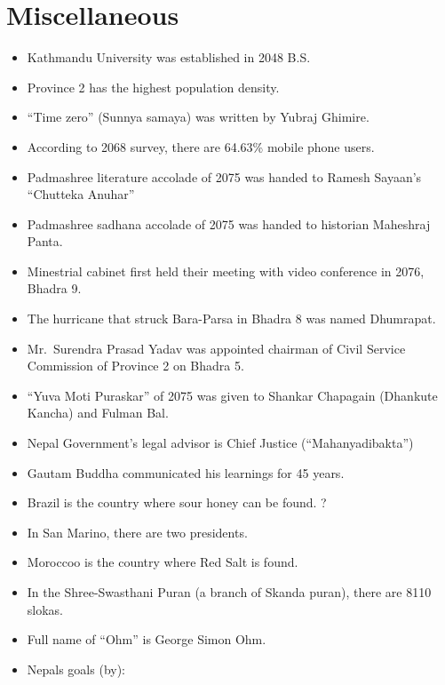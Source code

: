 \documentclass[
  openany]{book}
\providecommand{\tightlist}{%
  \setlength{\itemsep}{0pt}\setlength{\parskip}{0pt}}
\begin{document}
\hypertarget{miscellaneous}{%
\section{Miscellaneous}\label{miscellaneous}}

\begin{itemize}
\tightlist
\item
  Kathmandu University was established in 2048 B.S.
\item
  Province 2 has the highest population density.
\item
  ``Time zero'' (Sunnya samaya) was written by Yubraj Ghimire.
\item
  According to 2068 survey, there are 64.63\% mobile phone users.
\item
  Padmashree literature accolade of 2075 was handed to Ramesh Sayaan's ``Chutteka Anuhar''
\item
  Padmashree sadhana accolade of 2075 was handed to historian Maheshraj Panta.
\item
  Minestrial cabinet first held their meeting with video conference in 2076, Bhadra 9.
\item
  The hurricane that struck Bara-Parsa in Bhadra 8 was named Dhumrapat.
\item
  Mr.~Surendra Prasad Yadav was appointed chairman of Civil Service Commission of Province 2 on Bhadra 5.
\item
  ``Yuva Moti Puraskar'' of 2075 was given to Shankar Chapagain (Dhankute Kancha) and Fulman Bal.
\item
  Nepal Government's legal advisor is Chief Justice (``Mahanyadibakta'')
\item
  Gautam Buddha communicated his learnings for 45 years.
\item
  Brazil is the country where sour honey can be found. ?
\item
  In San Marino, there are two presidents.
\item
  Moroccoo is the country where Red Salt is found.
\item
  In the Shree-Swasthani Puran (a branch of Skanda puran), there are 8110 slokas.
\item
  Full name of ``Ohm'' is George Simon Ohm.
\item
  Nepals goals (by):


\end{itemize}
\end{document}
